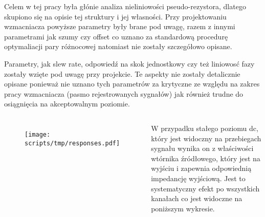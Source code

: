 \begin{frame}[t]
    \vspace{-1em}
    \begin{block}{\dk}
        {\renewcommand\normalsize{\small}%
        \normalsize
        }
    \end{block}
    {\renewcommand\normalsize{\small}%
    \normalsize
Celem w tej pracy była głónie analiza nieliniowości pseudo-rezystora, dlatego skupiono się na opisie tej struktury i jej własności.  Przy projektowaniu wzmacniacza powyższe  parametry  były brane pod uwagę, razem z innymi parametrami jak szumy czy offset co uznano za standardową procedurę optymaliacji pary różnocowej natomiast nie zostały szczegółowo opisane.


Parametry,  jak slew rate, odpowiedź na skok jednostkowy czy też liniowosć fazy zostały wzięte pod uwagę przy projekcie. Te aspekty nie zostały detalicznie opisane ponieważ nie uznano tych parametrów za krytyczne ze względu na zakres pracy wzmacniacza (pasmo rejestrowanych sygnałów) jak również trudne do osiągnięcia na akceptowalnym poziomie. 
    }
\end{frame}

\begin{frame}[t]
    \begin{columns}


        \begin{figure}
            \centering
            \texttt{[image: scripts/tmp/responses.pdf]}
        \end{figure}
        W przypadku stałego poziomu dc, który jest widoczny na przebiegach sygnału wynika on z właściwości wtórnika źródłowego, który jest na wyjściu i zapewnia odpowiednią impedancję wyjściową. Jest to systematyczny efekt po wszystkich kanałach co jest widoczne na poniższym wykresie. 

    \end{columns}


\end{frame}



